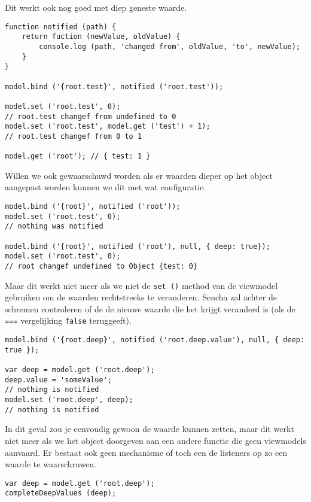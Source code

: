 Dit werkt ook nog goed met diep geneste waarde.

\begin{lstlisting}[language=ownjavascript]
function notified (path) {
	return fuction (newValue, oldValue) {
		console.log (path, 'changed from', oldValue, 'to', newValue);
	}
}

model.bind ('{root.test}', notified ('root.test'));

model.set ('root.test', 0);
// root.test changef from undefined to 0
model.set ('root.test', model.get ('test') + 1);
// root.test changef from 0 to 1

model.get ('root'); // { test: 1 }
\end{lstlisting}

Willen we ook gewaarschuwd worden als er waarden dieper op het object aangepast worden
kunnen we dit met wat configuratie.

\begin{lstlisting}[language=ownjavascript]
model.bind ('{root}', notified ('root'));
model.set ('root.test', 0);
// nothing was notified

model.bind ('{root}', notified ('root'), null, { deep: true});
model.set ('root.test', 0);
// root changef undefined to Object {test: 0}
\end{lstlisting}

Maar dit werkt niet meer als we niet de \lstinline{set ()} method van de viewmodel
gebruiken om de waarden rechtstreeks te veranderen. Sencha zal achter de schremen
controleren of de de nieuwe waarde die het krijgt veranderd is (als de \lstinline{===}
vergelijking \lstinline{false} teruggeeft).

\begin{lstlisting}[language=ownjavascript]
model.bind ('{root.deep}', notified ('root.deep.value'), null, { deep: true });

var deep = model.get ('root.deep');
deep.value = 'someValue';
// nothing is notified
model.set ('root.deep', deep);
// nothing is notified
\end{lstlisting}

In dit geval zou je eenvoudig gewoon de waarde kunnen zetten, maar dit werkt niet meer als
we het object doorgeven aan een andere functie die geen viewmodels aanvaard. Er bestaat
ook geen mechanisme of toch een de listeners op zo een waarde te waarschruwen.

\begin{lstlisting}[language=ownjavascript]
var deep = model.get ('root.deep');
completeDeepValues (deep);
\end{lstlisting}

